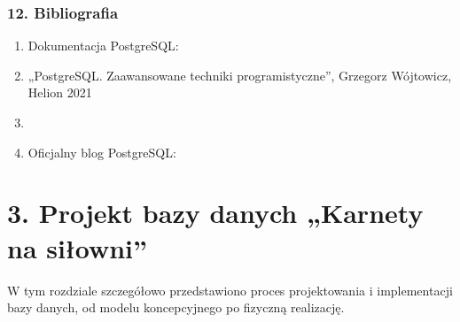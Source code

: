 \documentclass[letterpaper,10pt,polish]{sphinxmanual}
\begin{document}
\subsection{12. Bibliografia}
\label{\detokenize{rozdzial2/Partycjonowanie-danych/source/Partycjonowanie:bibliografia}}\begin{enumerate}
%
\item {} 
\sphinxAtStartPar
Dokumentacja PostgreSQL: 

\item {} 
\sphinxAtStartPar
„PostgreSQL. Zaawansowane techniki programistyczne”, Grzegorz Wójtowicz, Helion 2021

\item {} 
\sphinxAtStartPar
{}

\item {} 
\sphinxAtStartPar
Oficjalny blog PostgreSQL: 

\end{enumerate}

\sphinxstepscope


\chapter{3. Projekt bazy danych „Karnety na siłowni”}
\label{\detokenize{rozdzial3/rozdzial3:projekt-bazy-danych-karnety-na-silowni}}\label{\detokenize{rozdzial3/rozdzial3::doc}}
\sphinxAtStartPar
W tym rozdziale szczegółowo przedstawiono proces projektowania i implementacji bazy danych, od modelu koncepcyjnego po fizyczną realizację.
\end{document}

